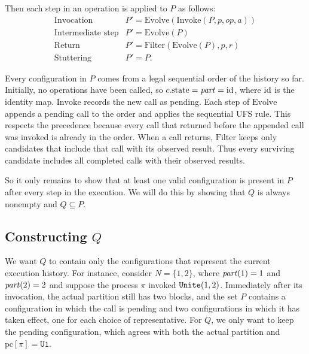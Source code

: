 \documentclass[12pt]{amsproc}
\begin{document}
Then each step in an operation is applied to $P$ as follows: 
\[
\begin{array}{ll}
\text{Invocation} & P'=\mathrm{Evolve}(\mathrm{Invoke}(P,p,op,a))\\
\text{Intermediate step} & P'=\mathrm{Evolve}(P)\\
\text{Return} & P'=\mathrm{Filter}(\mathrm{Evolve}(P),p,r)\\
\text{Stuttering} & P'=P.
\end{array}
\]

Every configuration in $P$ comes from a legal sequential order of the history so far. Initially, no operations have been called, so $c.\mathrm{state} = \mathit{part} = \operatorname{id}$, where $\operatorname{id}$ is the identity map. $\mathrm{Invoke}$ records the new call as pending. Each step of $\mathrm{Evolve}$ appends a pending call to the order and applies the sequential UFS rule. This respects the precedence because every call that returned
before the appended call was invoked is already in the order. When a call returns, $\mathrm{Filter}$ keeps only candidates that include that call with its observed result. Thus every surviving candidate includes all completed calls with their observed results.

So it only remains to show that at least one valid configuration is present in $P$ after every step in the execution. We will do this by showing that $Q$ is always nonempty and $Q\subseteq P$.



\subsection{Constructing \(Q\)}

\bbni 

We want $Q$ to contain only the configurations that represent the current execution history. For instance, consider $N = \{1, 2\}$, where $\mathit{part}(1) = 1$ and $\mathit{part}(2) = 2$ and suppose the process $\pi$ invoked $\texttt{Unite}{}(1,2)$. Immediately after its invocation, the actual partition still has two blocks, and the set $P$ contains a configuration in which the call is pending and two configurations in which it has taken effect, one for each choice of representative. For $Q$, we only want to keep the pending configuration, which agrees with both the actual partition and $\mathrm{pc}[\pi] = \texttt{U1}$.
\end{document}
